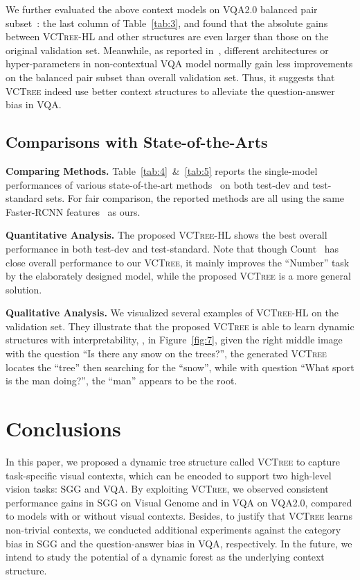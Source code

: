 \documentclass[10pt,twocolumn,letterpaper]{article}
\begin{document}
We further evaluated the above context models on VQA2.0 balanced pair subset~\cite{Teney_2018_CVPR}: the last column of Table~\ref{tab:3}, and found that the absolute gains between \textsc{VCTree}-HL and other structures are even larger than those on the original validation set. Meanwhile, as reported in~\cite{Teney_2018_CVPR}, different architectures or hyper-parameters in non-contextual VQA model normally gain less improvements on the balanced pair subset than overall validation set. Thus, it suggests that \textsc{VCTree} indeed use better context structures to alleviate the question-answer bias in VQA.

\subsection{Comparisons with State-of-the-Arts}
\noindent\textbf{Comparing Methods.} Table~\ref{tab:4}~\&~\ref{tab:5} reports the single-model performances of various state-of-the-art methods~\cite{bai2018deep, ben2017mutan, kim2016hadamard, Teney_2018_CVPR, zhang2018learning} on both test-dev and test-standard sets. For fair comparison, the reported methods are all using the same Faster-RCNN features~\cite{anderson2018bottom} as ours.

\noindent\textbf{Quantitative Analysis.} The proposed \textsc{VCTree}-HL shows the best overall performance in both test-dev and test-standard. Note that though Count~\cite{zhang2018learning} has close overall performance to our \textsc{VCTree}, it mainly improves the ``Number'' task by the elaborately designed model, while the proposed \textsc{VCTree} is a more general solution.  

\noindent\textbf{Qualitative Analysis.} We visualized several examples of \textsc{VCTree}-HL on the validation set. They illustrate that the proposed \textsc{VCTree} is able to learn dynamic structures with interpretability, \eg, in Figure~\ref{fig:7}, given the right middle image with the question ``Is there any snow on the trees?'', the generated \textsc{VCTree} locates the ``tree'' then searching for the ``snow'', while with question ``What sport is the man doing?'', the ``man'' appears to be the root.




\section{Conclusions}
In this paper, we proposed a dynamic tree structure called \textsc{VCTree} to capture task-specific visual contexts, which can be encoded to support two high-level vision tasks: SGG and VQA. By exploiting \textsc{VCTree}, we observed consistent performance gains in SGG on Visual Genome and in VQA on VQA2.0, compared to models with or without visual contexts. Besides, to justify that \textsc{VCTree} learns non-trivial contexts, we conducted additional experiments against the category bias in SGG and the question-answer bias in VQA, respectively. In the future, we intend to study the potential of a dynamic forest as the underlying context structure. 
\end{document}
